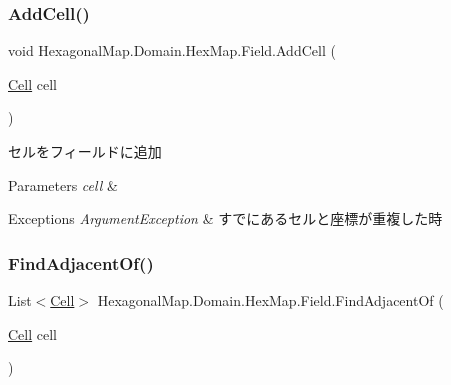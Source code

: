 \subsubsection{\texorpdfstring{Add\+Cell()}{AddCell()}}
{\footnotesize\ttfamily void Hexagonal\+Map.\+Domain.\+Hex\+Map.\+Field.\+Add\+Cell (\begin{DoxyParamCaption}\item[{\mbox{\hyperlink{class_hexagonal_map_1_1_domain_1_1_hex_map_1_1_cell}{Cell}}}]{cell }\end{DoxyParamCaption})\hspace{0.3cm}{\ttfamily [inline]}}



セルをフィールドに追加 


\begin{DoxyParams}{Parameters}
{\em cell} & \\
\hline
\end{DoxyParams}

\begin{DoxyExceptions}{Exceptions}
{\em Argument\+Exception} & すでにあるセルと座標が重複した時\\
\hline
\end{DoxyExceptions}
\mbox{\label{class_hexagonal_map_1_1_domain_1_1_hex_map_1_1_field_adf239d99b3cc5b0a8b1b4708fd270f17}} 
\subsubsection{\texorpdfstring{Find\+Adjacent\+Of()}{FindAdjacentOf()}}
{\footnotesize\ttfamily List$<$\mbox{\hyperlink{class_hexagonal_map_1_1_domain_1_1_hex_map_1_1_cell}{Cell}}$>$ Hexagonal\+Map.\+Domain.\+Hex\+Map.\+Field.\+Find\+Adjacent\+Of (\begin{DoxyParamCaption}\item[{\mbox{\hyperlink{class_hexagonal_map_1_1_domain_1_1_hex_map_1_1_cell}{Cell}}}]{cell }\end{DoxyParamCaption})\hspace{0.3cm}{\ttfamily [inline]}}



